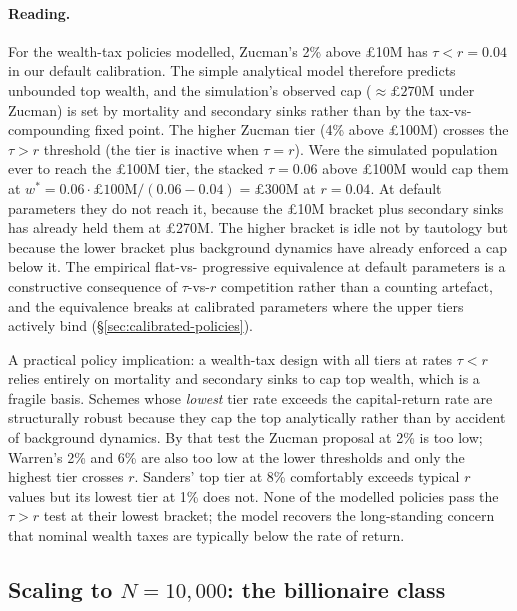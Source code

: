 \documentclass[11pt]{article}
\begin{document}
\paragraph{Reading.} For the wealth-tax policies modelled,
Zucman's 2\% above \pounds10M has $\tau < r = 0.04$ in our default
calibration. The simple analytical model therefore predicts
unbounded top wealth, and the simulation's observed cap
($\approx \pounds 270$M under Zucman) is set by mortality and
secondary sinks rather than by the tax-vs-compounding fixed point.
The higher Zucman tier (4\% above \pounds 100M) crosses the
$\tau > r$ threshold (the tier is inactive when $\tau = r$).
Were the simulated population ever to reach the \pounds 100M
tier, the stacked $\tau = 0.06$ above \pounds 100M would cap
them at $w^* = 0.06 \cdot \pounds 100\text{M} / (0.06 - 0.04)
= \pounds 300\text{M}$ at $r = 0.04$. At default parameters
they do not reach it, because the \pounds 10M bracket plus
secondary sinks has already held them at \pounds 270M. The
higher bracket is idle not by
tautology but because the lower bracket plus background dynamics
have already enforced a cap below it. The empirical flat-vs-
progressive equivalence at default parameters is a constructive
consequence of $\tau$-vs-$r$ competition rather than a counting
artefact, and the equivalence breaks at calibrated parameters
where the upper tiers actively bind (\S\ref{sec:calibrated-policies}).

A practical policy implication: a wealth-tax design with all tiers
at rates $\tau < r$ relies entirely on mortality and secondary
sinks to cap top wealth, which is a fragile basis. Schemes whose
\emph{lowest} tier rate exceeds the capital-return rate are
structurally robust because they cap the top analytically rather
than by accident of background dynamics. By that test the Zucman
proposal at 2\% is too low; Warren's 2\% and 6\% are also too low at
the lower thresholds and only the highest tier crosses $r$. Sanders'
top tier at 8\% comfortably exceeds typical $r$ values but its
lowest tier at 1\% does not. None of the modelled policies pass
the $\tau > r$ test at their lowest bracket; the model recovers
the long-standing concern that nominal wealth taxes are typically
below the rate of return.

\subsection{Scaling to \texorpdfstring{$N=10{,}000$}{N=10,000}: the billionaire class}
\label{sec:scale-up}
\end{document}
